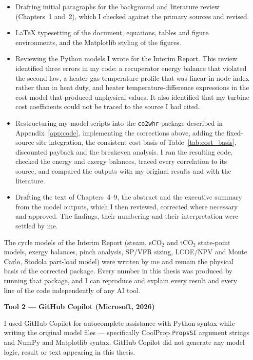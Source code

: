 \begin{itemize}[noitemsep,topsep=3pt]
  \item Drafting initial paragraphs for the background and literature review
    (Chapters~1 and~2), which I checked against the primary sources and
    revised.
  \item \LaTeX{} typesetting of the document, equations, tables and figure
    environments, and the Matplotlib styling of the figures.
  \item Reviewing the Python models I wrote for the Interim Report. This
    review identified three errors in my code: a recuperator energy balance
    that violated the second law, a heater gas-temperature profile that was
    linear in node index rather than in heat duty, and heater
    temperature-difference expressions in the cost model that produced
    unphysical values. It also identified that my turbine cost coefficients
    could not be traced to the source I had cited.
  \item Restructuring my model scripts into the \texttt{co2whr} package
    described in Appendix~\ref{app:code}, implementing the corrections above,
    adding the fixed-source site integration, the consistent cost basis of
    Table~\ref{tab:cost_basis}, discounted payback and the breakeven analysis.
    I ran the resulting code, checked the energy and exergy balances, traced
    every correlation to its source, and compared the outputs with my
    original results and with the literature.
  \item Drafting the text of Chapters~4--9, the abstract and the executive
    summary from the model outputs, which I then reviewed, corrected where
    necessary and approved. The findings, their numbering and their
    interpretation were settled by me.
\end{itemize}

\noindent The cycle models of the Interim Report (steam, sCO$_2$ and tCO$_2$
state-point models, exergy balances, pinch analysis, SP/VFR sizing, LCOE/NPV
and Monte Carlo, Stodola part-load model) were written by me and remain the
physical basis of the corrected package. Every number in this thesis was
produced by running that package, and I can reproduce and explain every
result and every line of the code independently of any AI tool.

\bigskip
\noindent\textbf{Tool 2 --- GitHub Copilot (Microsoft, 2026)~\cite{GitHubCopilot2026}}

\noindent I used GitHub Copilot for autocomplete assistance with Python
syntax while writing the original model files --- specifically CoolProp
\texttt{PropsSI} argument strings and NumPy and Matplotlib syntax. GitHub
Copilot did not generate any model logic, result or text appearing in this
thesis.

